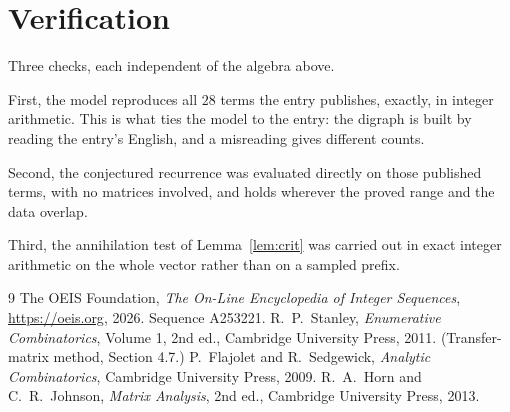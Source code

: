 \documentclass[11pt,a4paper]{article}
\theoremstyle{plain}
\theoremstyle{definition}
\begin{document}
\section{Verification}

Three checks, each independent of the algebra above.

First, the model reproduces all $28$ terms the entry publishes, exactly, in integer
arithmetic. This is what ties the model to the entry: the digraph is built by reading the
entry's English, and a misreading gives different counts.

Second, the conjectured recurrence was evaluated directly on those published terms, with no
matrices involved, and holds wherever the proved range and the data overlap.

Third, the annihilation test of Lemma~\ref{lem:crit} was carried out in exact integer
arithmetic on the whole vector rather than on a sampled prefix.

\begin{thebibliography}{9}
 The OEIS Foundation, \emph{The On-Line Encyclopedia of Integer
Sequences}, \url{https://oeis.org}, 2026. Sequence A253221.
 R.~P.~Stanley, \emph{Enumerative Combinatorics}, Volume 1, 2nd ed.,
Cambridge University Press, 2011. (Transfer-matrix method, Section 4.7.)
 P.~Flajolet and R.~Sedgewick, \emph{Analytic Combinatorics}, Cambridge
University Press, 2009.
 R.~A.~Horn and C.~R.~Johnson, \emph{Matrix Analysis}, 2nd ed., Cambridge
University Press, 2013.
\end{thebibliography}
\end{document}
